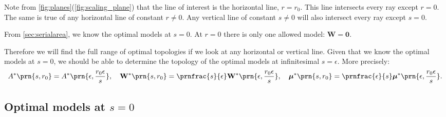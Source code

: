 \documentclass[12pt]{article}
\newcommand{\Wm}{W}
\newcommand{\W}{\mathbf{\Wm}}
\newcommand{\kktm}{\mu}
\newcommand{\kkt}{\boldsymbol{\kktm}}
\begin{document}
Note from \cref{fig:planes}(\ref{fig:scaling_plane}) that the line of interest is the horizontal line, \(r = r_0\).
This line intersects every ray except \(r = 0\).
The same is true of any horizontal line of constant \(r \neq 0\).
Any vertical line of constant \(s \neq 0\) will also intersect every ray except \(s = 0\).

From \cref{sec:serialarea}, we know the optimal models at \(s = 0\).
At \(r = 0\) there is only one allowed model: \(\W = \mathbf{0}\).

Therefore we will find the full range of optimal topologies if we look at any horizontal or vertical line.
Given that we know the optimal models at \(s = 0\), we should be able to determine the topology of the optimal models at infinitesimal \(s = \epsilon\).
More precisely:
%
\begin{equation}\label{eq:scaleopt}
  A^\ast\prn{s, r_0} = A^\ast\prn{\epsilon, \frac{r_0 \epsilon}{s}},
  \quad
  \W^\ast\prn{s, r_0} = \prnfrac{s}{\epsilon} \W^\ast\prn{\epsilon, \frac{r_0 \epsilon}{s}},
  \quad
  \kkt^\ast\prn{s, r_0} = \prnfrac{\epsilon}{s} \kkt^\ast\prn{\epsilon, \frac{r_0 \epsilon}{s}}.
\end{equation}
%


\subsection{Optimal models at \texorpdfstring{\(s=0\)}{s=0}}\label{sec:areamodels}
\end{document}
